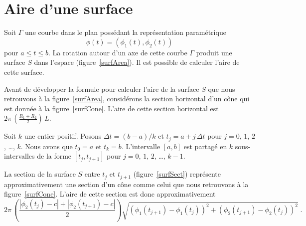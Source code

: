 {\section{Aire d'une surface \eng}

Soit $\Gamma$ une courbe dans le plan possédant la représentation
paramétrique
\[
\phi(t) = \left( \phi_1(t) , \phi_2(t) \right)
\]
pour $a \leq t \leq b$.  La rotation autour d'un axe de cette courbe
$\Gamma$ produit une surface $S$ dans l'espace
(figure~\ref{surfArea}).  Il est possible de calculer l'aire de cette
surface.


Avant de développer la formule pour calculer l'aire de la surface $S$
que nous retrouvons à la figure~\ref{surfArea}, considérons 
la section horizontal d'un cône qui est donnée à la
figure~\ref{surfCone}.  L'aire de cette section horizontal
est $\displaystyle 2\pi\,\left(\frac{R_1+R_2}{2}\right)\,L$.


Soit $k$ une entier positif.  Posons $\Delta t = (b-a)/k$ et
$t_j = a + j\,\Delta t$ pour $j=0$, $1$, $2$, \ldots, $k$.  Nous avons que
$t_0=a$ et $t_k = b$.  L'intervalle $[a,b]$ est partagé en
$k$ sous-intervalles de la forme $[t_j,t_{j+1}]$ pour $j=0$, $1$, $2$,
\ldots, $k-1$.

La section de la surface $S$ entre $t_j$ et $t_{j+1}$
(figure~\ref{surfSect}) représente approximativement une section d'un
cône comme celui que nous retrouvons à la figure~\ref{surfCone}.
L'aire de cette section est donc approximativement
\[
2\pi \, \left(\frac{ |\phi_2(t_j)-c| + |\phi_2(t_{j+1})-c|}{2}\right)
\sqrt{\left(\phi_1(t_{j+1})-\phi_1(t_j)\right)^2 +
\left( \phi_2(t_{j+1}) - \phi_2(t_j)\right)^2} \; .
\]


}
